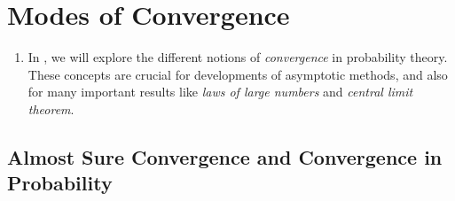 \section{Modes of Convergence}
\label{sect:mode-conv}
\begin{enumerate}
\item In , we will explore the different notions of
\emph{convergence} in probability theory. These concepts are crucial for
developments of asymptotic methods, and also for many important
results like \emph{laws of large numbers} and \emph{central limit theorem}.
\end{enumerate}
\subsection{Almost Sure Convergence and Convergence in Probability}
\label{subsect:conv-as-ip}
